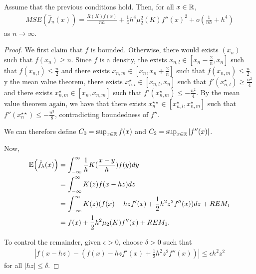 \begin{thm}
  \label{defn:Introduction:3}
  Assume that the previous conditions hold. Then, for all $x \in \mathbb{R}$,
  \begin{align}
    \label{eq:15}
    MSE(\hat f_{n}(x)) = \frac{R(K) f(x)}{nh} + \frac{1}{4} h^{4}
    \mu_{2}^{2}(K) f''(x)^{2} + o(\frac{1}{nh} + h^{4})
  \end{align} as $n \rightarrow \infty$.
\end{thm}

\begin{proof}
  We first claim that $f$ is bounded. Otherwise, there would exists
  $(x_{n})$ such that $f(x_{n}) \geq n$.  Since $f$ is a density, the
  exists $x_{n, l} \in [x_{n} - \frac{2}{n}, x_{n}]$ such that
  $f(x_{n, l}) \leq \frac{n}{2}$  and there exists $x_{n, m} \in
  [x_{n}, x_{n} + \frac{2}{n}]$ such that $f(x_{n, m}) \leq
  \frac{n}{2}$.  y the mean value theorem, there exists $x^{\star}_{n,
  l} \in [x_{n, l}, x_{n}]$ such that $f'(x^{\star}_{n, l}) \geq
\frac{n^{2}}{4}$ and there exists $x^{\star}_{n, m} \in [x_{n}, x_{n,
  m}]$ such that $f'(x^{\star}_{n, m}) \leq -\frac{n^{2}}{4}$.  By the
mean value theorem again, we have that there exists $x_{n}^{\star
  \star} \in [x_{n, l}^{\star}, x_{n, m}^{\star}]$ such that
$f''(x_{n}^{\star \star}) \leq -\frac{n^{3}}{8}$, contradicting
boundedness of $f''$.

We can therefore define $C_{0} = \sup_{x \in \mathbb{R}} f(x)$ and $C_{2} =
\sup_{x \in \mathbb{R}} |f''(x)|$.

Now,
\begin{align}
  \label{eq:16}
  \E{\hat f_{h}(x)} &= \int_{-\infty}^{\infty} \frac{1}{h}
  K(\frac{x-y}{h}) f(y) dy \\
  &= \int_{-\infty}^{\infty}  K(z) f(x - hz) dz \\
  &= \int_{-\infty}^{\infty} K(z)(f(x) - hz f'(x) + \frac{1}{2} h^{2}
  z^{2} f''(x)) dz + REM_{1} \\
  &= f(x) + \frac{1}{2} h^{2} \mu_{2}(K) f''(x) + REM_{1}.
\end{align}

To control the remainder, given $\epsilon > 0$, choose $\delta > 0$
such that
\begin{align}
  \label{eq:17}
  |f(x - hz) - (f(x) - hz f'(x) + \frac{1}{2} h^{2} z^{2} f''(x))|
  \leq \epsilon h^{2} z^{2}
\end{align} for all $|hz| \leq \delta$.


\end{proof}
